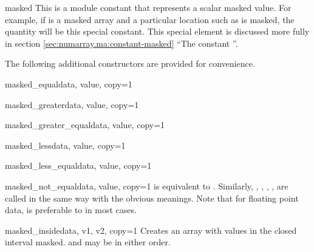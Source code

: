 \begin{datadesc}{masked}
   This is a module constant that represents a scalar masked value. For
   example, if  is a masked array and a particular location such as
    is masked, the quantity  will be this special
   constant. This special element is discussed more fully in section
   \ref{sec:numarray.ma:constant-masked} ``The constant ''.
\end{datadesc}


The following additional constructors are provided for convenience.

\begin{methoddesc}[MaskedArray]{masked_equal}{data, value, copy=1}
\end{methoddesc} 
\begin{methoddesc}[MaskedArray]{masked_greater}{data, value, copy=1}
\end{methoddesc} 
\begin{methoddesc}[MaskedArray]{masked_greater_equal}{data, value, copy=1}
\end{methoddesc} 
\begin{methoddesc}[MaskedArray]{masked_less}{data, value, copy=1}
\end{methoddesc} 
\begin{methoddesc}[MaskedArray]{masked_less_equal}{data, value, copy=1}
\end{methoddesc} 
\begin{methoddesc}[MaskedArray]{masked_not_equal}{data, value, copy=1}
    is equivalent to .  Similarly, ,
   , , ,
    are called in the same way with the obvious
   meanings.  Note that for floating point data,  is
   preferable to  in most cases.  
\end{methoddesc}

\begin{methoddesc}[MaskedArray]{masked_inside}{data, v1, v2, copy=1}
   Creates an array with values in the closed interval \code{[v1, v2]} masked.
    and  may be in either order.
\end{methoddesc}

